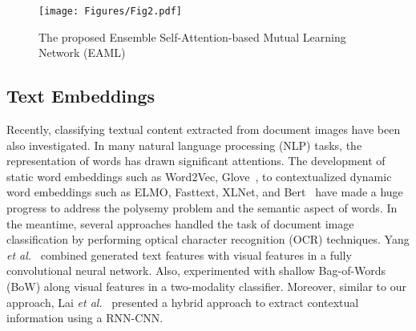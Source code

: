 \documentclass[twocolumn]{svjour3}
\newcommand{\etal}{\textit{et al.}}
\begin{document}
\begin{figure*}[ht]
\centering
  \texttt{[image: Figures/Fig2.pdf]}
  \caption{The proposed Ensemble Self-Attention-based Mutual Learning Network (EAML)}
    \label{fig:DAPML_architecture}
\end{figure*}


\subsection{Text Embeddings}

Recently, classifying textual content extracted from document images have been also investigated. In many natural language processing (NLP) tasks, the representation of words has drawn significant attentions. The development of static word embeddings such as Word2Vec, Glove~\cite{Mikolov2013EfficientEO, Pennington2014GloveGV}, to contextualized dynamic word embeddings such as ELMO, Fasttext, XLNet, and Bert~\cite{Peters2018DeepCW, Yang2019XLNetGA, Mikolov2018AdvancesIP, Devlin2019BERTPO} have made a huge progress to address the polysemy problem and the semantic aspect of words. In the meantime, several approaches handled the task of document image classification by performing optical character recognition (OCR) techniques. Yang \etal~\cite{Yang2017LearningTE} combined generated text features with visual features in a fully convolutional neural network. Also, \cite{Augereau2014ImprovingCO, Dauphinee2019ModularMA} experimented with shallow Bag-of-Words (BoW) along visual features in a two-modality classifier. Moreover, similar to our approach, Lai \etal~\cite{Lai2015RecurrentCN} presented a hybrid approach to extract contextual information using a RNN-CNN.
\end{document}
